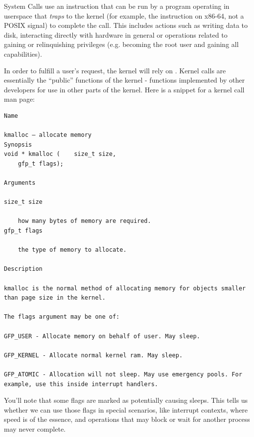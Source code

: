 System Calls use an instruction that can be run by a program operating in userspace that \textit{traps} to the kernel (for example, the  instruction on x86-64, not a POSIX signal) to complete the call.
This includes actions such as writing data to disk, interacting directly with hardware in general or operations related to gaining or relinquishing privileges (e.g.  becoming the root user and gaining all capabilities).

In order to fulfill a user's request, the kernel will rely on .
Kernel calls are essentially the ``public'' functions of the kernel - functions implemented by other developers for use in other parts of the kernel.
Here is a snippet for a kernel call man page:

\begin{lstlisting}
Name

kmalloc — allocate memory
Synopsis
void * kmalloc (	size_t size,
 	gfp_t flags);

Arguments

size_t size

    how many bytes of memory are required.
gfp_t flags

    the type of memory to allocate.

Description

kmalloc is the normal method of allocating memory for objects smaller than page size in the kernel.

The flags argument may be one of:

GFP_USER - Allocate memory on behalf of user. May sleep.

GFP_KERNEL - Allocate normal kernel ram. May sleep.

GFP_ATOMIC - Allocation will not sleep. May use emergency pools. For example, use this inside interrupt handlers.
\end{lstlisting}

You'll note that some flags are marked as potentially causing sleeps.
This tells us whether we can use those flags in special scenarios, like interrupt contexts, where speed is of the essence, and operations that may block or wait for another process may never complete.

